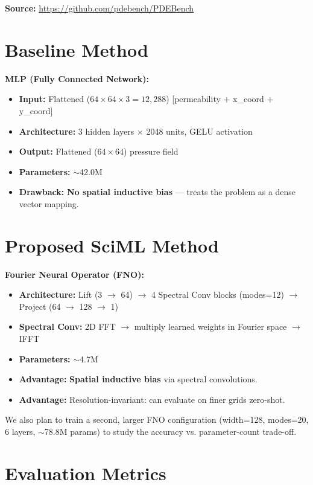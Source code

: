 \documentclass[12pt, a4paper]{article}
\begin{document}
\noindent
\textbf{Source:} \url{https://github.com/pdebench/PDEBench}

\section{Baseline Method}
\textbf{MLP (Fully Connected Network):}
\begin{itemize}[noitemsep, topsep=2pt]
    \item \textbf{Input:} Flattened ($64 \times 64 \times 3 = 12,288$) [permeability + x\_coord + y\_coord]
    \item \textbf{Architecture:} 3 hidden layers $\times$ 2048 units, GELU activation
    \item \textbf{Output:} Flattened ($64 \times 64$) pressure field
    \item \textbf{Parameters:} $\sim$42.0M
    \item \textbf{Drawback:} \textbf{No spatial inductive bias} — treats the problem as a dense vector mapping.
\end{itemize}

\section{Proposed SciML Method}
\textbf{Fourier Neural Operator (FNO):}
\begin{itemize}[noitemsep, topsep=2pt]
    \item \textbf{Architecture:} Lift (3 $\to$ 64) $\to$ 4 Spectral Conv blocks (modes=12) $\to$ Project (64 $\to$ 128 $\to$ 1)
    \item \textbf{Spectral Conv:} 2D FFT $\to$ multiply learned weights in Fourier space $\to$ IFFT
    \item \textbf{Parameters:} $\sim$4.7M
    \item \textbf{Advantage:} \textbf{Spatial inductive bias} via spectral convolutions.
    \item \textbf{Advantage:} Resolution-invariant: can evaluate on finer grids zero-shot.
\end{itemize}

\noindent
We also plan to train a second, larger FNO configuration (width=128, modes=20, 6 layers, $\sim$78.8M params) to study the accuracy vs. parameter-count trade-off.

\section{Evaluation Metrics}
\end{document}
